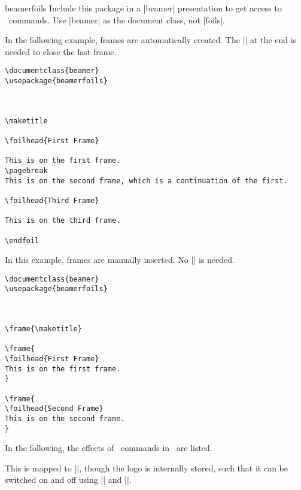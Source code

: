 \begin{package}{{beamerfoils}}
  Include this package in a |beamer| presentation to get access to \foils\ commands. Use |beamer| as the document class, not |foils|.

  \example
  In the following example, frames are automatically created. The |\endfoil| at the end is needed to close the last frame.

\begin{verbatim}
\documentclass{beamer}
\usepackage{beamerfoils}



\maketitle

\foilhead{First Frame}

This is on the first frame.
\pagebreak
This is on the second frame, which is a continuation of the first.

\foilhead{Third Frame}

This is on the third frame.

\endfoil

\end{verbatim}

  \example
  In this example, frames are manually inserted. No |\endfoil| is needed.

\begin{verbatim}
\documentclass{beamer}
\usepackage{beamerfoils}



\frame{\maketitle}

\frame{
\foilhead{First Frame}
This is on the first frame.
}

\frame{
\foilhead{Second Frame}
This is on the second frame.
}

\end{verbatim}
\end{package}

In the following, the effects of \foils\ commands in \beamer\ are listed.

\begin{command}{\MyLogo{}}
  This is mapped to |\logo|, though the logo is internally stored, such that it can be switched on and off using |\LogoOn| and |\LogoOff|.
\end{command}

